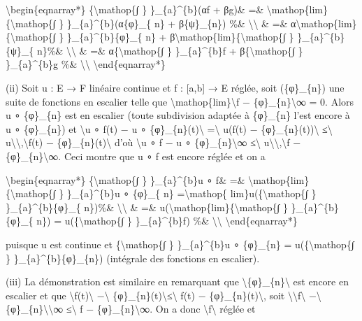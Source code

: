 \documentclass[]{article}
\begin{document}
\textbackslash{}begin\{eqnarray*\} \{\textbackslash{}mathop\{∫ \}
\}\_\{a\}\^{}\{b\}(αf + βg)\& =\&
\textbackslash{}mathop\{lim\}\{\textbackslash{}mathop\{∫ \}
\}\_\{a\}\^{}\{b\}(α\{φ\}\_\{ n\} + β\{ψ\}\_\{n\}) \%\&
\textbackslash{}\textbackslash{} \& =\&
α\textbackslash{}mathop\{lim\}\{\textbackslash{}mathop\{∫ \}
\}\_\{a\}\^{}\{b\}\{φ\}\_\{ n\} +
β\textbackslash{}mathop\{lim\}\{\textbackslash{}mathop\{∫ \}
\}\_\{a\}\^{}\{b\}\{ψ\}\_\{ n\}\%\& \textbackslash{}\textbackslash{} \&
=\& α\{\textbackslash{}mathop\{∫ \} \}\_\{a\}\^{}\{b\}f +
β\{\textbackslash{}mathop\{∫ \} \}\_\{a\}\^{}\{b\}g \%\&
\textbackslash{}\textbackslash{} \textbackslash{}end\{eqnarray*\}

(ii) Soit u : E → F linéaire continue et f : {[}a,b{]} → E réglée, soit
(\{φ\}\_\{n\}) une suite de fonctions en escalier telle que
\textbackslash{}mathop\{lim\}\textbackslash{}\textbar{}f −
\{φ\}\_\{n\}\textbackslash{}\textbar{}∞ = 0. Alors u ∘ \{φ\}\_\{n\} est
en escalier (toute subdivision adaptée à \{φ\}\_\{n\} l'est encore à u ∘
\{φ\}\_\{n\}) et \textbackslash{}\textbar{}u ∘ f(t) − u ∘
\{φ\}\_\{n\}(t)\textbackslash{}\textbar{} =\textbackslash{}\textbar{}
u(f(t) − \{φ\}\_\{n\}(t))\textbackslash{}\textbar{}
≤\textbackslash{}\textbar{}
u\textbackslash{}\textbar{}\textbackslash{},\textbackslash{}\textbar{}f(t)
− \{φ\}\_\{n\}(t)\textbackslash{}\textbar{} d'où
\textbackslash{}\textbar{}u ∘ f − u ∘
\{φ\}\_\{n\}\textbackslash{}\textbar{}∞ ≤\textbackslash{}\textbar{}
u\textbackslash{}\textbar{}\textbackslash{},\textbackslash{}\textbar{}f
− \{φ\}\_\{n\}\textbackslash{}\textbar{}∞. Ceci montre que u ∘ f est
encore réglée et on a

\textbackslash{}begin\{eqnarray*\} \{\textbackslash{}mathop\{∫ \}
\}\_\{a\}\^{}\{b\}u ∘ f\& =\&
\textbackslash{}mathop\{lim\}\{\textbackslash{}mathop\{∫ \}
\}\_\{a\}\^{}\{b\}u ∘ \{φ\}\_\{ n\} =\textbackslash{}mathop\{
lim\}u(\{\textbackslash{}mathop\{∫ \} \}\_\{a\}\^{}\{b\}\{φ\}\_\{
n\})\%\& \textbackslash{}\textbackslash{} \& =\&
u(\textbackslash{}mathop\{lim\}\{\textbackslash{}mathop\{∫ \}
\}\_\{a\}\^{}\{b\}\{φ\}\_\{ n\}) = u(\{\textbackslash{}mathop\{∫ \}
\}\_\{a\}\^{}\{b\}f) \%\& \textbackslash{}\textbackslash{}
\textbackslash{}end\{eqnarray*\}

puisque u est continue et \{\textbackslash{}mathop\{∫ \}
\}\_\{a\}\^{}\{b\}u ∘ \{φ\}\_\{n\} = u(\{\textbackslash{}mathop\{∫ \}
\}\_\{a\}\^{}\{b\}\{φ\}\_\{n\}) (intégrale des fonctions en escalier).

(iii) La démonstration est similaire en remarquant que
\textbackslash{}\textbar{}\{φ\}\_\{n\}\textbackslash{}\textbar{} est
encore en escalier et que
\textbar{}\textbackslash{}\textbar{}f(t)\textbackslash{}\textbar{}
−\textbackslash{}\textbar{}
\{φ\}\_\{n\}(t)\textbackslash{}\textbar{}\textbar{}≤\textbackslash{}\textbar{}
f(t) − \{φ\}\_\{n\}(t)\textbackslash{}\textbar{}, soit
\textbackslash{}\textbar{}\textbackslash{}\textbar{}f\textbackslash{}\textbar{}
−\textbackslash{}\textbar{}
\{φ\}\_\{n\}\textbackslash{}\textbar{}\textbackslash{}\textbar{}∞
≤\textbackslash{}\textbar{} f − \{φ\}\_\{n\}\textbackslash{}\textbar{}∞.
On a donc \textbackslash{}\textbar{}f\textbackslash{}\textbar{} réglée
et
\end{document}
